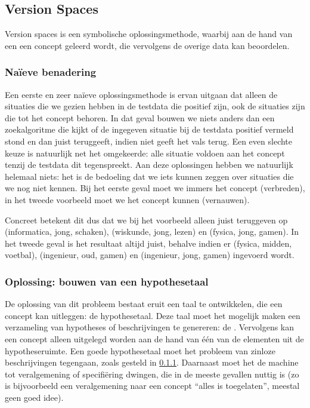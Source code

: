 \subsection{Version Spaces}
Version spaces is een symbolische oplossingsmethode, waarbij aan de hand van een  een concept geleerd wordt, die vervolgens de overige data kan beoordelen.
\subsubsection{Na\"ieve benadering}
\label{sss:versionSpacesNaif}
Een eerste en zeer na\"ieve oplossingsmethode is ervan uitgaan dat alleen de situaties die we gezien hebben in de testdata die positief zijn, ook de situaties zijn die tot het concept behoren. In dat geval bouwen we niets anders dan een zoekalgoritme die kijkt of de ingegeven situatie bij de testdata positief vermeld stond en dan juist teruggeeft, indien niet geeft het vals terug. Een even slechte keuze is natuurlijk net het omgekeerde: alle situatie voldoen aan het concept tenzij de testdata dit tegenspreekt. Aan deze oplossingen hebben we natuurlijk helemaal niets: het is de bedoeling dat we iets kunnen zeggen over situaties die we nog niet kennen. Bij het eerste geval moet we immers het concept  (verbreden), in het tweede voorbeeld moet we het concept kunnen  (vernauwen).
\begin{leftbar}
Concreet betekent dit dus dat we bij het voorbeeld alleen juist teruggeven op (informatica, jong, schaken), (wiskunde, jong, lezen) en (fysica, jong, gamen). In het tweede geval is het resultaat altijd juist, behalve indien er (fysica, midden, voetbal), (ingenieur, oud, gamen) en (ingenieur, jong, gamen) ingevoerd wordt. 
\end{leftbar}
\subsubsection{Oplossing: bouwen van een hypothesetaal}
De oplossing van dit probleem bestaat eruit een taal te ontwikkelen, die een concept kan uitleggen: de hypothesetaal. Deze taal moet het mogelijk maken een verzameling van hypotheses of beschrijvingen te genereren: de . Vervolgens kan een concept alleen uitgelegd worden aan de hand van \'e\'en van de elementen uit de hypotheseruimte. Een goede hypothesetaal moet het probleem van zinloze beschrijvingen tegengaan, zoals gesteld in \ref{sss:versionSpacesNaif}. Daarnaast moet het de machine tot veralgemening of specifi\"ering dwingen, die in de meeste gevallen nuttig is (zo is bijvoorbeeld een veralgemening naar een concept ``alles is toegelaten'', meestal geen goed idee).
